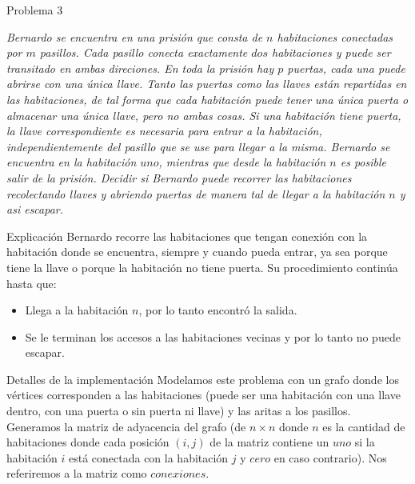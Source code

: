 \begin{section}{Problema 3}

	\textit{Bernardo se encuentra en una prisión que consta de $n$ habitaciones conectadas por $m$ pasillos. Cada pasillo conecta exactamente $dos$ habitaciones y puede ser transitado en ambas direciones. En toda la prisión hay $p$ puertas, cada una puede abrirse con una única llave. Tanto las puertas como las llaves están repartidas en las habitaciones, de tal forma que cada habitación puede tener una única puerta o almacenar una única llave, pero no ambas cosas. Si una habitación tiene puerta, la llave correspondiente es necesaria para entrar a la habitación, independientemente del pasillo que se use para llegar a la misma. Bernardo se encuentra en la habitación $uno$, mientras que desde la habitación $n$ es posible salir de la prisión. Decidir si Bernardo puede recorrer las habitaciones recolectando llaves y abriendo puertas de manera tal de llegar a la habitación $n$ y asi escapar.}
		
	\begin{subsection}{Explicación}
		Bernardo recorre las habitaciones que tengan conexión con la habitación donde se encuentra, siempre y cuando pueda entrar, ya sea porque tiene la llave o porque la habitación no tiene puerta. Su procedimiento continúa hasta que:
		\begin{itemize}
			\item Llega a la habitación $n$, por lo tanto encontró la salida.
			\item Se le terminan los accesos a las habitaciones vecinas y por lo tanto no puede escapar.
		\end{itemize}

	\end{subsection}

	\begin{subsection}{Detalles de la implementación}
		Modelamos este problema con un grafo donde los vértices corresponden a las habitaciones (puede ser una habitación con una llave dentro, con una puerta o sin puerta ni llave) y las aritas a los pasillos.\\	

		Generamos la matriz de adyacencia del grafo (de $n\times n$ donde $n$ es la cantidad de habitaciones donde cada posición $(i,j)$ de la matriz contiene un $uno$ si la habitación $i$ está conectada con la habitación $j$ y $cero$ en caso contrario). Nos referiremos a la matriz como $conexiones$.\\


\end{subsection}
\end{section}
